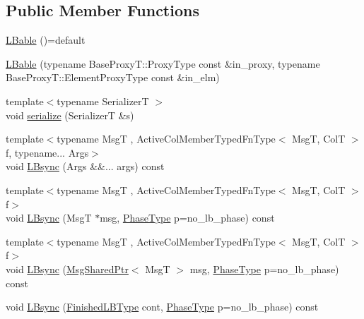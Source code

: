 \subsection*{Public Member Functions}
\begin{DoxyCompactItemize}
\item 
\hyperlink{structvt_1_1vrt_1_1collection_1_1_l_bable_a974e761dc819d64c3c46216dc0034b0a}{L\+Bable} ()=default
\item 
\hyperlink{structvt_1_1vrt_1_1collection_1_1_l_bable_abf19aead7dc4f5cef1affe568a1a03d0}{L\+Bable} (typename Base\+Proxy\+T\+::\+Proxy\+Type const \&in\+\_\+proxy, typename Base\+Proxy\+T\+::\+Element\+Proxy\+Type const \&in\+\_\+elm)
\item 
{\footnotesize template$<$typename SerializerT $>$ }\\void \hyperlink{structvt_1_1vrt_1_1collection_1_1_l_bable_aa67e248263b00c518aabc537869de11f}{serialize} (SerializerT \&s)
\item 
{\footnotesize template$<$typename MsgT , Active\+Col\+Member\+Typed\+Fn\+Type$<$ Msg\+T, Col\+T $>$ f, typename... Args$>$ }\\void \hyperlink{structvt_1_1vrt_1_1collection_1_1_l_bable_a9c11d9aaefd0d09c6813dc46aeda8496}{L\+Bsync} (Args \&\&... args) const
\item 
{\footnotesize template$<$typename MsgT , Active\+Col\+Member\+Typed\+Fn\+Type$<$ Msg\+T, Col\+T $>$ f$>$ }\\void \hyperlink{structvt_1_1vrt_1_1collection_1_1_l_bable_a7c891593867734d0e2e30cb1c6b23b44}{L\+Bsync} (MsgT $\ast$msg, \hyperlink{namespacevt_a46ce6733d5cdbd735d561b7b4029f6d7}{Phase\+Type} p=no\+\_\+lb\+\_\+phase) const
\item 
{\footnotesize template$<$typename MsgT , Active\+Col\+Member\+Typed\+Fn\+Type$<$ Msg\+T, Col\+T $>$ f$>$ }\\void \hyperlink{structvt_1_1vrt_1_1collection_1_1_l_bable_a7993e0f7203032a228ea8c98c7f22db6}{L\+Bsync} (\hyperlink{namespacevt_ab2b3d506ec8e8d1540aede826d84a239}{Msg\+Shared\+Ptr}$<$ MsgT $>$ msg, \hyperlink{namespacevt_a46ce6733d5cdbd735d561b7b4029f6d7}{Phase\+Type} p=no\+\_\+lb\+\_\+phase) const
\item 
void \hyperlink{structvt_1_1vrt_1_1collection_1_1_l_bable_afbe9af7e28e18236fd5af36d04e46aca}{L\+Bsync} (\hyperlink{structvt_1_1vrt_1_1collection_1_1_l_bable_a27cc10ccbf93ad3d794998c79f710a5a}{Finished\+L\+B\+Type} cont, \hyperlink{namespacevt_a46ce6733d5cdbd735d561b7b4029f6d7}{Phase\+Type} p=no\+\_\+lb\+\_\+phase) const
\item 

\end{DoxyCompactItemize}
